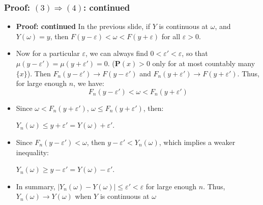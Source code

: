 \documentclass[handout]{beamer}
\newcommand{\BP}{\mathbf{P}}
\begin{document}
\frame
{
  \frametitle{Proof: $(3) \Rightarrow (4)$: continued} 

   \begin{itemize}
          
                     
                     \item<1-> \textbf{Proof: continued}  In the previous slide, if $Y$ is continuous at $\omega$, and $Y(\omega)=y$, then $F(y-\varepsilon)<\omega< F(y+\varepsilon) $ for all $\varepsilon>0$. 
                     
                     \item<2-> Now for a particular $\varepsilon$, we can always find $0<\varepsilon'<\varepsilon$, so that $\mu(y-\varepsilon')=\mu(y+\varepsilon')=0$. ($\BP(x)>0$ only for at most countably many $\{x\}$). Then $F_n(y-\varepsilon')\rightarrow F(y-\varepsilon')$ and $F_n(y+\varepsilon')\rightarrow F(y+\varepsilon')$. Thus, for large enough $n$, we have:  
                     $$F_n(y-\varepsilon')<\omega< F_n(y+\varepsilon') $$                  
                     
                     \item<3->[-] Since $\omega< F_n(y+\varepsilon')$, $\omega \le F_n(y+\varepsilon')$, then: 
                     
       \hspace{3cm}             $Y_n(\omega)\leq  y+\varepsilon'=Y(\omega)+\varepsilon'$. 
       
       \vspace{5mm}
                     \item<4->[-] Since $F_n(y-\varepsilon')<\omega$, then $ y-\varepsilon' < Y_n(\omega) $, which implies a weaker inequality: 
                     
       \hspace{3cm}             $Y_n(\omega)\geq y-\varepsilon'=Y(\omega)-\varepsilon'$. 
                            \vspace{5mm}

                         \item<5->[-] In summary, $|Y_n(\omega)-Y(\omega)|\leq \varepsilon'<\varepsilon$ for large enough $n$. Thus, $Y_n(\omega)\rightarrow Y(\omega)$ when $Y$ is continuous at $\omega$
                                                                  
                                               \end{itemize}
}
\end{document}
